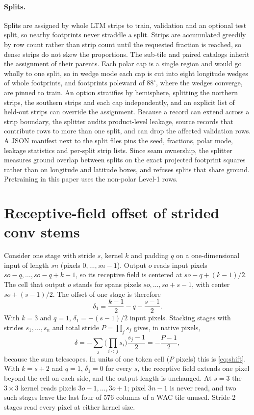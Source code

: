 \paragraph{Splits.} Splits are assigned by whole LTM strips to train, validation and an optional test split, so nearby footprints never straddle a split. Strips are accumulated greedily by row count rather than strip count until the requested fraction is reached, so dense strips do not skew the proportions. The sub-tile and paired catalogs inherit the assignment of their parents. Each polar cap is a single region and would go wholly to one split, so in wedge mode each cap is cut into eight longitude wedges of whole footprints, and footprints poleward of $88^\circ$, where the wedges converge, are pinned to train. An option stratifies by hemisphere, splitting the northern strips, the southern strips and each cap independently, and an explicit list of held-out strips can override the assignment. Because a record can extend across a strip boundary, the splitter audits product-level leakage, source records that contribute rows to more than one split, and can drop the affected validation rows. A JSON manifest next to the split files pins the seed, fractions, polar mode, leakage statistics and per-split strip lists. Since seam ownership, the splitter measures ground overlap between splits on the exact projected footprint squares rather than on longitude and latitude boxes, and refuses splits that share ground. Pretraining in this paper uses the non-polar Level-1 rows. 

\section{Receptive-field offset of strided conv stems}
\label{sec:supp_stem}

Consider one stage with stride $s$, kernel $k$ and padding $q$ on a one-dimensional input of length $sn$ (pixels $0,\dots,sn{-}1$). Output $o$ reads input pixels $so{-}q,\dots,so{-}q{+}k{-}1$, so its receptive field is centered at $so - q + (k{-}1)/2$. The cell that output $o$ stands for spans pixels $so,\dots,so{+}s{-}1$, with center $so + (s{-}1)/2$. The offset of one stage is therefore
\begin{equation}
  \delta_1 = \frac{k-1}{2} - q - \frac{s-1}{2}.
\end{equation}
With $k{=}3$ and $q{=}1$, $\delta_1 = -(s{-}1)/2$ input pixels. Stacking stages with strides $s_1, \dots, s_n$ and total stride $P = \prod_j s_j$ gives, in native pixels,
\begin{equation}
  \delta = -\sum_{j} \Big(\prod_{i<j} s_i\Big)\frac{s_j-1}{2} = -\frac{P-1}{2},
\end{equation}
because the sum telescopes. In units of one token cell ($P$ pixels) this is \cref{eq:shift}. With $k{=}s{+}2$ and $q{=}1$, $\delta_1{=}0$ for every $s$, the receptive field extends one pixel beyond the cell on each side, and the output length is unchanged. At $s{=}3$ the $3\times3$ kernel reads pixels $3o{-}1,\dots,3o{+}1$; pixel $3n{-}1$ is never read, and two such stages leave the last four of 576 columns of a WAC tile unused. Stride-2 stages read every pixel at either kernel size.

